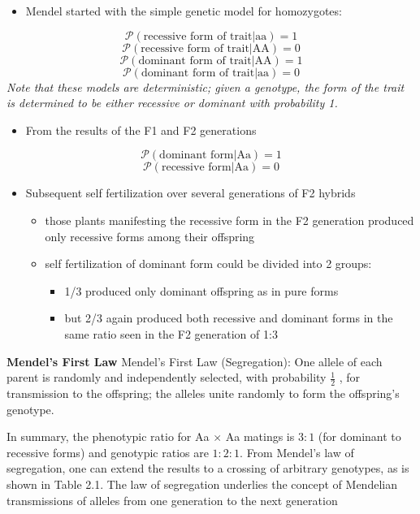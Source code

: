 \documentclass[a4paper,twoside,11pt]{article}
\begin{document}
\begin{itemize}
    \item Mendel started with the simple genetic model for homozygotes:
\end{itemize}
$$
\mathcal{P}(\text{recessive form of trait|aa}) = 1
$$
$$
\mathcal{P}(\text{recessive form of trait|AA}) = 0
$$
$$
\mathcal{P}(\text{dominant form of trait|AA}) = 1
$$
$$
\mathcal{P}(\text{dominant form of trait|aa}) = 0
$$
\textcolor{NavyBlue}{\textit{Note that these models are deterministic; given a genotype, the form of the trait is determined to be either recessive or dominant with probability 1.}}
\begin{itemize}
    \item From the results of the F1 and F2 generations
\end{itemize}
$$
\mathcal{P}(\text{dominant form|Aa}) = 1
$$
$$
\mathcal{P}(\text{recessive form|Aa}) = 0
$$
\begin{itemize}
    \item Subsequent self fertilization over several generations of F2 hybrids
    \begin{itemize}
        \item those plants manifesting the recessive form in the F2 generation produced only recessive forms among their offspring
        \item self fertilization of dominant form could be divided into 2 groups: 
        \begin{itemize}
            \item 1/3 produced only dominant offspring as in pure forms
            \item but 2/3 again produced both recessive and dominant forms in the same ratio seen in the F2 generation of 1:3
        \end{itemize}
    \end{itemize}
\end{itemize}
\begin{shaded*}
\noindent \textbf{Mendel's First Law}
\newline
\noindent Mendel’s First Law (Segregation): One allele of each parent is randomly and independently selected, with probability $\frac{1}{2}$ , for transmission to the offspring; the alleles unite randomly to form the offspring’s genotype.
\end{shaded*}
In summary, the phenotypic ratio for Aa $\times$ Aa matings is $3:1$ (for dominant to recessive forms) and genotypic ratios are $1:2:1$. From Mendel’s law of segregation, one can extend the results to a crossing of arbitrary genotypes, as is shown in Table 2.1. The law of segregation underlies the concept of Mendelian transmissions of alleles from one generation to the next generation
\end{document}
